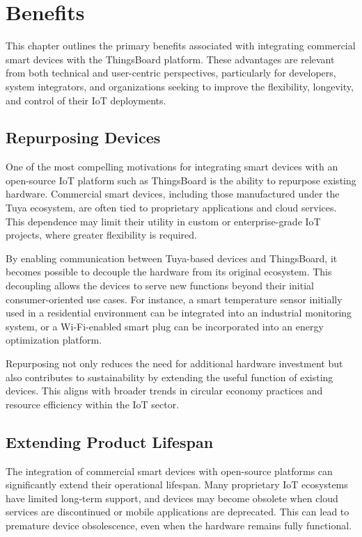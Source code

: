 
\chapter{Benefits}

This chapter outlines the primary benefits associated with integrating commercial smart devices with the ThingsBoard platform. These advantages are relevant from both technical and user-centric perspectives, particularly for developers, system integrators, and organizations seeking to improve the flexibility, longevity, and control of their IoT deployments.

\section{Repurposing Devices}

One of the most compelling motivations for integrating smart devices with an open-source IoT platform such as ThingsBoard is the ability to repurpose existing hardware. Commercial smart devices, including those manufactured under the Tuya ecosystem, are often tied to proprietary applications and cloud services. This dependence may limit their utility in custom or enterprise-grade IoT projects, where greater flexibility is required.

By enabling communication between Tuya-based devices and ThingsBoard, it becomes possible to decouple the hardware from its original ecosystem. This decoupling allows the devices to serve new functions beyond their initial consumer-oriented use cases. For instance, a smart temperature sensor initially used in a residential environment can be integrated into an industrial monitoring system, or a Wi-Fi-enabled smart plug can be incorporated into an energy optimization platform.

Repurposing not only reduces the need for additional hardware investment but also contributes to sustainability by extending the useful function of existing devices. This aligns with broader trends in circular economy practices and resource efficiency within the IoT sector.

\section{Extending Product Lifespan}

The integration of commercial smart devices with open-source platforms can significantly extend their operational lifespan. Many proprietary IoT ecosystems have limited long-term support, and devices may become obsolete when cloud services are discontinued or mobile applications are deprecated. This can lead to premature device obsolescence, even when the hardware remains fully functional.


